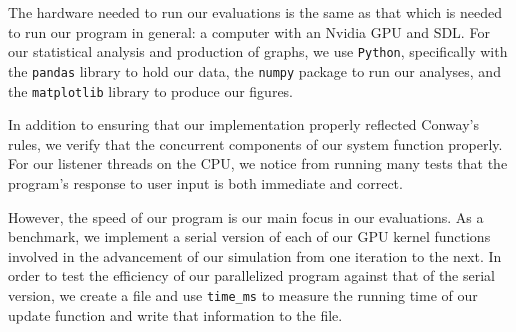 \documentclass[onecolumn,12pt]{IEEEtran}
\begin{document}

The hardware needed to run our evaluations is the same as that which is needed
to run our program in general: a computer with an Nvidia GPU and SDL. For our
statistical analysis and production of graphs, we use \texttt{Python},
specifically with the \texttt{pandas} library to hold our data, the
\texttt{numpy} package to run our analyses, and the \texttt{matplotlib} library
to produce our figures.  

In addition to ensuring that our implementation properly reflected Conway's
rules, we verify that the concurrent components of our system function
properly. For our listener threads on the CPU, we notice from running many
tests that the program's response to user input is both immediate and correct. 
    
However, the speed of our program is our main focus in our evaluations. As a
benchmark, we implement a serial version of each of our GPU kernel functions
involved in the advancement of our simulation from one iteration to the next.
In order to test the efficiency of our parallelized program against that of the
serial version, we create a file and use \texttt{time\_ms} to measure the
running time of our update function and write that information to the file. 
    
\end{document}
